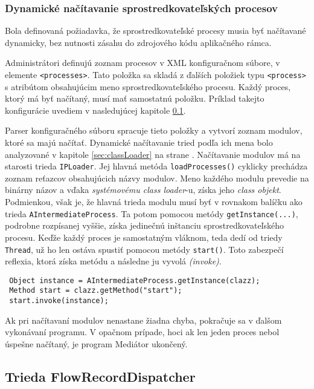 \subsubsection{Dynamické načítavanie sprostredkovateľských procesov}

Bola definovaná požiadavka, že sprostredkovateľské procesy musia byť načítavané dynamicky, bez nutnosti
zásahu do zdrojového kódu aplikačného rámca. 

Administrátori definujú zoznam procesov v XML konfiguračnom súbore, v elemente \verb|<processes>|. 
Tato položka sa skladá z ďalších položiek typu \verb|<process>| s atribútom 
obsahujúcim meno sprostredkovateľského procesu. Každý proces, ktorý má byť načítaný, musí mať 
samostatnú položku. Príklad takejto konfigurácie uvediem v nasledujúcej kapitole \ref{sec:FlowRecordDispatcher}.

Parser konfiguračného súboru spracuje tieto položky a vytvorí zoznam modulov, ktoré sa majú načítať.
Dynamické načítavanie tried podľa ich mena bolo analyzované v kapitole \ref{sec:classLoader} na strane
\pageref{sec:classLoader}. Načítavanie modulov má na starosti trieda \verb|IPLoader|. Jej hlavná metóda
\verb|loadProcesses()| cyklicky prechádza zoznam reťazcov obsahujúcich názvy modulov. Meno každého 
modulu prevedie na binárny názov a vďaka \emph{systémovému class loader}-u, získa jeho 
\emph{class objekt}. Podmienkou, však je, že hlavná trieda modulu musí byť v rovnakom balíčku ako trieda
\verb|AIntermediateProcess|. Ta potom pomocou metódy \verb|getInstance(...)|, podrobne rozpísanej vyššie, 
získa jedinečnú inštanciu sprostredkovateľského procesu. Keďže každý proces je samostatným vláknom, teda 
dedí od triedy \verb|Thread|, už ho len ostáva spustiť pomocou metódy \verb|start()|. Toto zabezpečí 
reflexia, ktorá získa metódu a následne ju vyvolá \emph{(invoke)}.
\begin{verbatim}
 Object instance = AIntermediateProcess.getInstance(clazz);
 Method start = clazz.getMethod("start");
 start.invoke(instance);
\end{verbatim}

Ak pri načítavaní modulov nenastane žiadna chyba, pokračuje sa v ďalšom vykonávaní programu. V opačnom 
prípade, hoci ak len jeden proces nebol úspešne načítaný, je program Mediátor ukončený.




\subsection{Trieda FlowRecordDispatcher} \label{sec:FlowRecordDispatcher}

